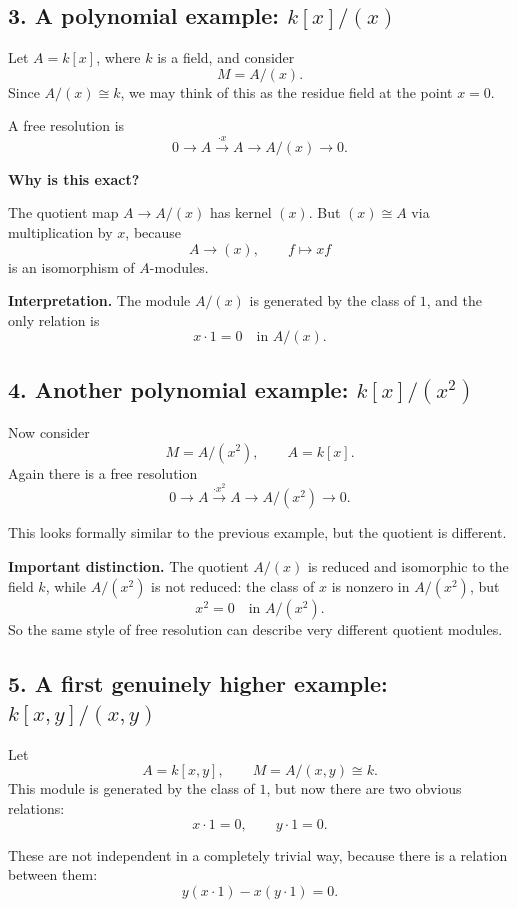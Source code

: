 \documentclass[12pt,a4paper]{article}
\theoremstyle{notespace}
\theoremstyle{definition}
\begin{document}
\subsection{3. A polynomial example: \(k[x]/(x)\)}

Let \(A=k[x]\), where \(k\) is a field, and consider
\[
M=A/(x).
\]
Since \(A/(x)\cong k\), we may think of this as the residue field at the point \(x=0\).

A free resolution is
\[
0 \longrightarrow A \xrightarrow{\cdot x} A \longrightarrow A/(x) \longrightarrow 0.
\]

\textbf{Why is this exact?}

The quotient map \(A \to A/(x)\) has kernel \((x)\).
But \((x)\cong A\) via multiplication by \(x\), because
\[
A \longrightarrow (x), \qquad f \mapsto xf
\]
is an isomorphism of \(A\)-modules.

\textbf{Interpretation.}
The module \(A/(x)\) is generated by the class of \(1\), and the only relation is
\[
x\cdot 1 = 0 \quad \text{in } A/(x).
\]

\subsection{4. Another polynomial example: \(k[x]/(x^2)\)}

Now consider
\[
M=A/(x^2), \qquad A=k[x].
\]
Again there is a free resolution
\[
0 \longrightarrow A \xrightarrow{\cdot x^2} A \longrightarrow A/(x^2) \longrightarrow 0.
\]

This looks formally similar to the previous example, but the quotient is different.

\textbf{Important distinction.}
The quotient \(A/(x)\) is reduced and isomorphic to the field \(k\), while \(A/(x^2)\) is not reduced: the class of \(x\) is nonzero in \(A/(x^2)\), but
\[
x^2=0 \quad \text{in } A/(x^2).
\]
So the same style of free resolution can describe very different quotient modules.

\subsection{5. A first genuinely higher example: \(k[x,y]/(x,y)\)}

Let
\[
A=k[x,y], \qquad M=A/(x,y)\cong k.
\]
This module is generated by the class of \(1\), but now there are two obvious relations:
\[
x\cdot 1=0, \qquad y\cdot 1=0.
\]

These are not independent in a completely trivial way, because there is a relation between them:
\[
y(x\cdot 1)-x(y\cdot 1)=0.
\]
\end{document}
